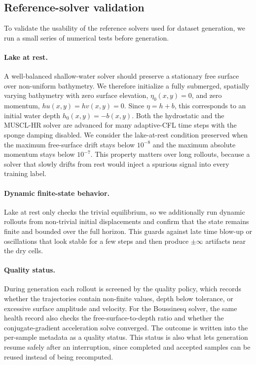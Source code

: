 \subsection{Reference-solver validation}
\label{subsec:reference-validation}

To validate the usability of the reference solvers used for dataset generation, we run a small series of numerical tests before generation.

\paragraph{Lake at rest.} A well-balanced shallow-water solver should preserve a stationary free surface over non-uniform bathymetry. We therefore initialize a fully submerged, spatially varying bathymetry with zero surface elevation, $\eta_0(x,y) = 0$, and zero momentum, $hu(x,y) = hv(x,y) = 0$. Since $\eta = h + b$, this corresponds to an initial water depth $h_0(x,y) = -b(x,y)$. Both the hydrostatic and the MUSCL-HR solver are advanced for many adaptive-CFL time steps with the sponge damping disabled. We consider the lake-at-rest condition preserved when the maximum free-surface drift stays below $10^{-8}$ and the maximum absolute momentum stays below $10^{-7}$. This property matters over long rollouts, because a solver that slowly drifts from rest would inject a spurious signal into every training label.

\paragraph{Dynamic finite-state behavior.} Lake at rest only checks the trivial equilibrium, so we additionally run dynamic rollouts from non-trivial initial displacements and confirm that the state remains finite and bounded over the full horizon. This guards against late time blow-up or oscillations that look stable for a few steps and then produce $\pm\infty$ artifacts near the dry cells.

\paragraph{Quality status.} During generation each rollout is screened by the quality policy, which records whether the trajectories contain non-finite values, depth below tolerance, or excessive surface amplitude and velocity. For the Boussinesq solver, the same health record also checks the free-surface-to-depth ratio and whether the conjugate-gradient acceleration solve converged. The outcome is written into the per-sample metadata as a quality status. This status is also what lets generation resume safely after an interruption, since completed and accepted samples can be reused instead of being recomputed.

